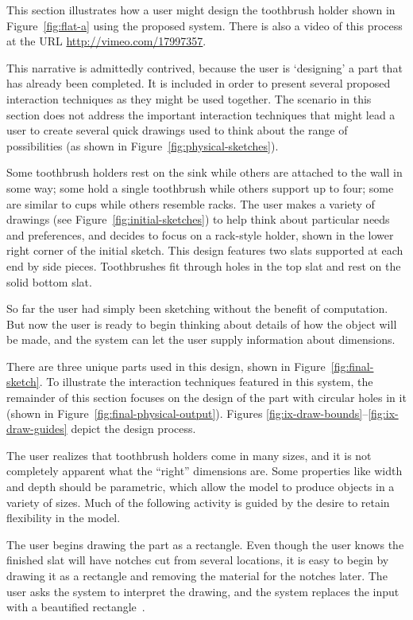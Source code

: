 \documentclass[11pt]{article}
\begin{document}
This section illustrates how a user might design the toothbrush holder
shown in Figure~\ref{fig:flat-a} using the proposed system. There is
also a video of this process at the URL
\href{http://vimeo.com/17997357}{http://vimeo.com/17997357}.

This narrative is admittedly contrived, because the user is
`designing' a part that has already been completed. It is included in
order to present several proposed interaction techniques as they might
be used together. The scenario in this section does not address the
important interaction techniques that might lead a user to create
several quick drawings used to think about the range of possibilities
(as shown in Figure~\ref{fig:physical-sketches}).

Some toothbrush holders rest on the sink while others are attached to
the wall in some way; some hold a single toothbrush while others
support up to four; some are similar to cups while others resemble
racks. The user makes a variety of drawings (see
Figure~\ref{fig:initial-sketches}) to help think about particular
needs and preferences, and decides to focus on a rack-style holder,
shown in the lower right corner of the initial sketch. This design
features two slats supported at each end by side pieces. Toothbrushes
fit through holes in the top slat and rest on the solid bottom slat.

So far the user had simply been sketching without the benefit of
computation. But now the user is ready to begin thinking about details
of how the object will be made, and the system can let the user supply
information about dimensions.

There are three unique parts used in this design, shown in
Figure~\ref{fig:final-sketch}. To illustrate the interaction
techniques featured in this system, the remainder of this section
focuses on the design of the part with circular holes in it (shown in
Figure~\ref{fig:final-physical-output}). Figures
\ref{fig:ix-draw-bounds}--\ref{fig:ix-draw-guides} depict the design
process.

The user realizes that toothbrush holders come in many sizes, and it
is not completely apparent what the ``right'' dimensions are. Some
properties like width and depth should be parametric, which allow the
model to produce objects in a variety of sizes. Much of the following
activity is guided by the desire to retain flexibility in the model.

The user begins drawing the part as a rectangle. Even though the user
knows the finished slat will have notches cut from several locations,
it is easy to begin by drawing it as a rectangle and removing the
material for the notches later. The user asks the system to interpret
the drawing, and the system replaces the input with a beautified
rectangle~\cite{pavlidis-beautifier}.
\end{document}
